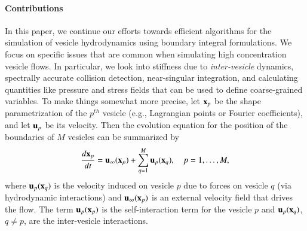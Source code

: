 \paragraph{Contributions}
In this paper, we continue our efforts towards efficient algorithms for
the simulation of vesicle hydrodynamics using boundary integral
formulations.  We focus on specific issues that are common when
simulating high concentration vesicle flows.  In particular, we look
into stiffness due to {\em inter-vesicle} dynamics, spectrally accurate
collision detection, near-singular integration, and calculating
quantities like pressure and stress fields that can be used to define
coarse-grained variables.  To make things somewhat more precise, let
${\mathbf{x}}_{p}$ be the shape parametrization of the $p^{\mathit th}$ vesicle
(e.g., Lagrangian points or Fourier coefficients), and let ${\mathbf{u}}_{p}$ be
its velocity. Then the evolution equation for the position of the
boundaries of $M$ vesicles can be summarized by
\begin{align}
 \frac{d {\mathbf{x}}_p}{d t} ={\mathbf{u}}_\infty({\mathbf{x}}_p) + \sum_{q=1}^M {\mathbf{u}}_{p}({\mathbf{x}}_{q}), \quad
p=1,\ldots,M,
\label{e:highlevel}
\end{align}
where ${\mathbf{u}}_{p}({\mathbf{x}}_{q})$ is the velocity induced on vesicle $p$ due to
forces on vesicle $q$ (via hydrodynamic interactions) and
${\mathbf{u}}_\infty({\mathbf{x}}_p)$ is an external velocity field that drives the flow.
The term ${\mathbf{u}}_{p}({\mathbf{x}}_{p})$ is the self-interaction term for the vesicle
$p$ and ${\mathbf{u}}_{p}({\mathbf{x}}_{q})$, $q \neq p$, are the inter-vesicle
interactions.

